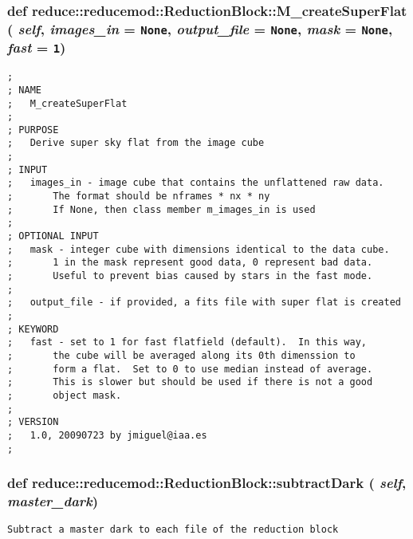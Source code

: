 \subsubsection{\setlength{\rightskip}{0pt plus 5cm}def reduce::reducemod::Reduction\-Block::M\_\-create\-Super\-Flat ( {\em self},  {\em images\_\-in} = {\tt None},  {\em output\_\-file} = {\tt None},  {\em mask} = {\tt None},  {\em fast} = {\tt 1})}\label{classreduce_1_1reducemod_1_1ReductionBlock_0a6384ee4efdba8ab2f2bbfc32395b8d}




\footnotesize\begin{verbatim}
;
; NAME
;   M_createSuperFlat
;
; PURPOSE
;   Derive super sky flat from the image cube
;
; INPUT
;   images_in - image cube that contains the unflattened raw data.
;       The format should be nframes * nx * ny 
;       If None, then class member m_images_in is used
;
; OPTIONAL INPUT
;   mask - integer cube with dimensions identical to the data cube.
;       1 in the mask represent good data, 0 represent bad data.
;       Useful to prevent bias caused by stars in the fast mode.
;
;   output_file - if provided, a fits file with super flat is created
;
; KEYWORD
;   fast - set to 1 for fast flatfield (default).  In this way,
;       the cube will be averaged along its 0th dimenssion to
;       form a flat.  Set to 0 to use median instead of average.
;       This is slower but should be used if there is not a good
;       object mask.
;
; VERSION
;   1.0, 20090723 by jmiguel@iaa.es
;
\end{verbatim}
\normalsize
\subsubsection{\setlength{\rightskip}{0pt plus 5cm}def reduce::reducemod::Reduction\-Block::subtract\-Dark ( {\em self},  {\em master\_\-dark})}\label{classreduce_1_1reducemod_1_1ReductionBlock_6bdf1a09ece607fdf29bff30358fcb7c}




\footnotesize\begin{verbatim}Subtract a master dark to each file of the reduction block
\end{verbatim}
\normalsize
